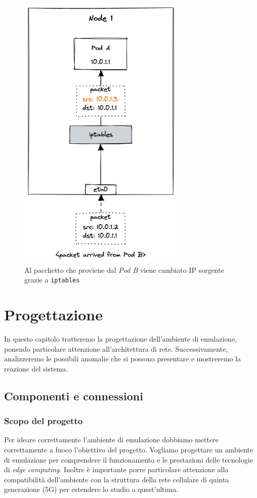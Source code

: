 \documentclass[12pt, hidelinks]{report}
\begin{document}
\begin{figure}[H]
    \centering
    \includegraphics[width=8cm]{8-service-to-pod.png}
    \caption{Al pacchetto che proviene dal \textit{Pod B} viene cambiato IP sorgente grazie a \texttt{iptables} \cite{demystifying-kube-proxy}}
    \label{fig:service-to-pod}
\end{figure}

\chapter{Progettazione}

In questo capitolo tratteremo la progettazione dell'ambiente di emulazione, ponendo particolare attenzione all'architettura di rete. Successivamente, analizzeremo le possibili anomalie che si possono presentare e mostreremo la reazione del sistema.

\section{Componenti e connessioni}
\subsection{Scopo del progetto}
Per ideare correttamente l'ambiente di emulazione dobbiamo mettere correttamente a fuoco l'obiettivo del progetto. Vogliamo progettare un ambiente di emulazione per comprendere il funzionamento e le prestazioni delle tecnologie di \textit{edge computing}. Inoltre è importante porre particolare attenzione alla compatibilità dell'ambiente con la struttura della rete cellulare di quinta generazione (5G) per estendere lo studio a quest'ultima.
\end{document}
